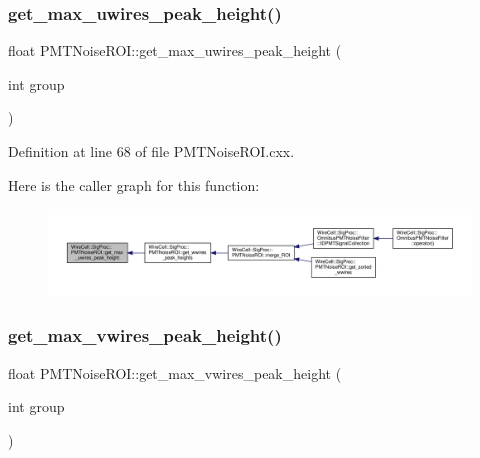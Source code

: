 \subsubsection{\texorpdfstring{get\+\_\+max\+\_\+uwires\+\_\+peak\+\_\+height()}{get\_max\_uwires\_peak\_height()}}
{\footnotesize\ttfamily float P\+M\+T\+Noise\+R\+O\+I\+::get\+\_\+max\+\_\+uwires\+\_\+peak\+\_\+height (\begin{DoxyParamCaption}\item[{int}]{group }\end{DoxyParamCaption})}



Definition at line 68 of file P\+M\+T\+Noise\+R\+O\+I.\+cxx.

Here is the caller graph for this function\+:
\nopagebreak
\begin{figure}[H]
\begin{center}
\leavevmode
\includegraphics[width=350pt]{class_wire_cell_1_1_sig_proc_1_1_p_m_t_noise_r_o_i_a44c13f88197acd2204d17bc2b9b75f3e_icgraph}
\end{center}
\end{figure}
\mbox{\label{class_wire_cell_1_1_sig_proc_1_1_p_m_t_noise_r_o_i_a5c9e02b024551af28776257cfb336f45}} 
\subsubsection{\texorpdfstring{get\+\_\+max\+\_\+vwires\+\_\+peak\+\_\+height()}{get\_max\_vwires\_peak\_height()}}
{\footnotesize\ttfamily float P\+M\+T\+Noise\+R\+O\+I\+::get\+\_\+max\+\_\+vwires\+\_\+peak\+\_\+height (\begin{DoxyParamCaption}\item[{int}]{group }\end{DoxyParamCaption})}



